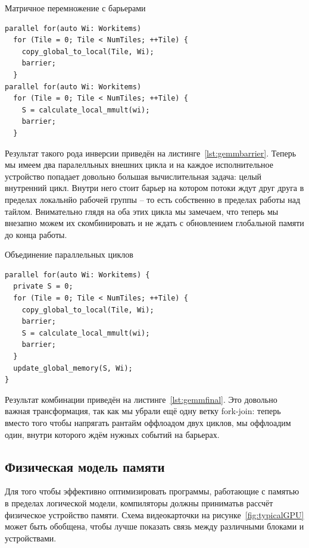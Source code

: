 \begin{ListingEnv}[!h]
    \captiondelim{ } 
    \caption{Матричное перемножение с барьерами}\label{lst:gemmbarrier}
    \begin{lstlisting}[language={[ISO]C++}]
parallel for(auto Wi: Workitems)
  for (Tile = 0; Tile < NumTiles; ++Tile) {
    copy_global_to_local(Tile, Wi);
    barrier;
  }
parallel for(auto Wi: Workitems)
  for (Tile = 0; Tile < NumTiles; ++Tile) {
    S = calculate_local_mmult(wi);
    barrier;
  }
    \end{lstlisting}
\end{ListingEnv}

Результат такого рода инверсии приведён на листинге~\cref{lst:gemmbarrier}. Теперь мы имеем два паралелльных внешних цикла и на каждое исполнительное устройство попадает довольно большая вычислительная задача: целый внутренний цикл. Внутри него стоит барьер на котором потоки ждут друг друга в пределах локальнйо рабочей группы -- то есть собственно в пределах работы над тайлом. Внимательно глядя на оба этих цикла мы замечаем, что теперь мы внезапно можем их скомбинировать и не ждать с обновлением глобальной памяти до конца работы.

\begin{ListingEnv}[!h]
    \captiondelim{ } 
    \caption{Объединение параллельных циклов}\label{lst:gemmfinal}
    \begin{lstlisting}[language={[ISO]C++}]
parallel for(auto Wi: Workitems) {
  private S = 0;
  for (Tile = 0; Tile < NumTiles; ++Tile) {
    copy_global_to_local(Tile, Wi);
    barrier;
    S = calculate_local_mmult(wi);
    barrier;
  }
  update_global_memory(S, Wi);
}
    \end{lstlisting}
\end{ListingEnv}

Результат комбинации приведён на листинге~\cref{lst:gemmfinal}. Это довольно важная трансформация, так как мы убрали ещё одну ветку fork-join: теперь вместо того чтобы напрягать рантайм оффлоадом двух циклов, мы оффлоадим один, внутри которого ждём нужных событий на барьерах.

\subsection{Физическая модель памяти}\label{subsec:overview/logical/physmem}

Для того чтобы эффективно оптимизировать программы, работающие с памятью в пределах логической модели, компиляторы должны приниматьв  рассчёт физическое устройство памяти. Схема видеокарточки на рисунке~\cref{fig:typicalGPU} может быть обобщена, чтобы лучше показать связь между различными блоками и устройствами.

